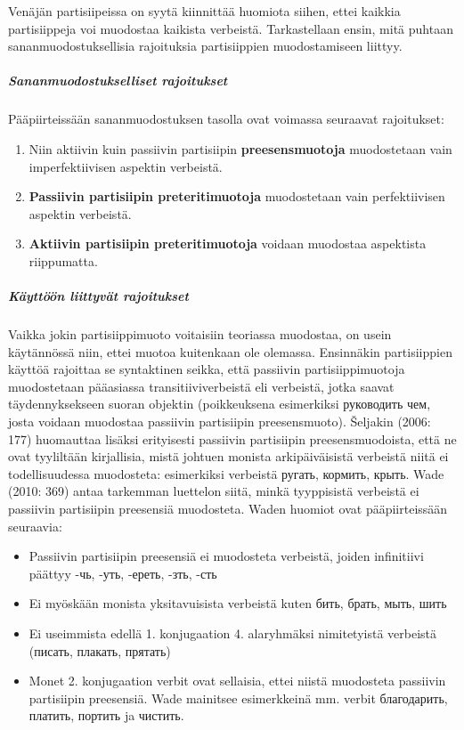 \documentclass[]{scrreprt}
\providecommand{\tightlist}{%
  \setlength{\itemsep}{0pt}\setlength{\parskip}{0pt}}
\begin{document}
Venäjän partisiipeissa on syytä kiinnittää huomiota siihen, ettei
kaikkia partisiippeja voi muodostaa kaikista verbeistä. Tarkastellaan
ensin, mitä puhtaan sananmuodostuksellisia rajoituksia partisiippien
muodostamiseen liittyy.

\subparagraph{Sananmuodostukselliset
rajoitukset}\label{sananmuodostukselliset-rajoitukset}

Pääpiirteissään sananmuodostuksen tasolla ovat voimassa seuraavat
rajoitukset:

\begin{enumerate}
\def\labelenumi{\arabic{enumi}.}
\tightlist
\item
  Niin aktiivin kuin passiivin partisiipin \textbf{preesensmuotoja}
  muodostetaan vain imperfektiivisen aspektin verbeistä.
\item
  \textbf{Passiivin partisiipin preteritimuotoja} muodostetaan vain
  perfektiivisen aspektin verbeistä.
\item
  \textbf{Aktiivin partisiipin preteritimuotoja} voidaan muodostaa
  aspektista riippumatta.
\end{enumerate}

\subparagraph{Käyttöön liittyvät
rajoitukset}\label{kuxe4yttuxf6uxf6n-liittyvuxe4t-rajoitukset}

Vaikka jokin partisiippimuoto voitaisiin teoriassa muodostaa, on usein
käytännössä niin, ettei muotoa kuitenkaan ole olemassa. Ensinnäkin
partisiippien käyttöä rajoittaa se syntaktinen seikka, että passiivin
partisiippimuotoja muodostetaan pääasiassa transitiiviverbeistä eli
verbeistä, jotka saavat täydennyksekseen suoran objektin (poikkeuksena
esimerkiksi руководить чем, josta voidaan muodostaa passiivin
partisiipin preesensmuoto). Šeljakin (2006: 177) huomauttaa lisäksi
erityisesti passiivin partisiipin preesensmuodoista, että ne ovat
tyyliltään kirjallisia, mistä johtuen monista arkipäiväisistä verbeistä
niitä ei todellisuudessa muodosteta: esimerkiksi verbeistä ругать,
кормить, крыть. Wade (2010: 369) antaa tarkemman luettelon siitä, minkä
tyyppisistä verbeistä ei passiivin partisiipin preesensiä muodosteta.
Waden huomiot ovat pääpiirteissään seuraavia:

\begin{itemize}
\tightlist
\item
  Passiivin partisiipin preesensiä ei muodosteta verbeistä, joiden
  infinitiivi päättyy -чь, -уть, -ереть, -зть, -сть
\item
  Ei myöskään monista yksitavuisista verbeistä kuten бить, брать, мыть,
  шить
\item
  Ei useimmista edellä 1. konjugaation 4. alaryhmäksi nimitetyistä
  verbeistä (писать, плакать, прятать)
\item
  Monet 2. konjugaation verbit ovat sellaisia, ettei niistä muodosteta
  passiivin partisiipin preesensiä. Wade mainitsee esimerkkeinä mm.
  verbit благодарить, платить, портить ja чистить.
\end{itemize}
\end{document}
